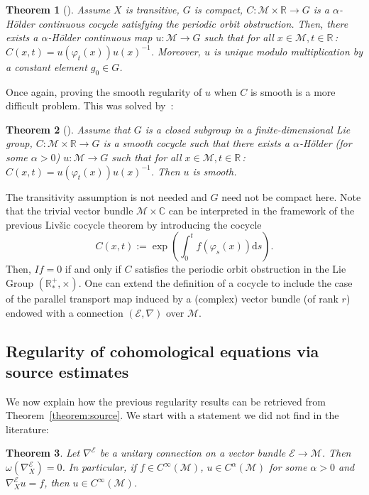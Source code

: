 \documentclass[10pt]{amsart}
\newtheorem{theo}{Theorem}[section]
\theoremstyle{definition}\newtheorem{defi}[theo]{Definition}\newtheorem{rema}[theo]{Remark}\newtheorem{exam}[theo]{Example}\newtheorem{exem}[theo]{Example}\newtheorem{nota}[theo]{Notation}
\newcommand{\C}{\mathbb{C}}
\newcommand{\R}{\mathbb{R}}
\newcommand{\mc}{\mathcal}
\newcommand{\M}{\mathcal{M}}
\newcommand{\E}{\mathcal{E}}
\newcommand{\dd}{\mathrm{d}}
\begin{document}
\begin{theo}[\cite{Livsic-72}]
Assume $X$ is transitive, $G$ is compact, $C : \mc{M} \times \R \rightarrow G$ is a $\alpha$-H\"older continuous cocycle satisfying the periodic orbit obstruction. Then, there exists a $\alpha$-H\"older continuous map $u : \M \rightarrow G$ such that for all $x \in \M, t \in \R\,$: $C(x,t) = u(\varphi_t(x))u(x)^{-1}$. Moreover, $u$ is unique modulo multiplication by a constant element $g_0 \in G$.
\end{theo}

Once again, proving the smooth regularity of $u$ when $C$ is smooth is a more difficult problem. This was solved by~\cite[Theorem~2.4]{Nitica-Torok-98}:

\begin{theo}[\cite{Nitica-Torok-98}]\label{theorem:livsic-smooth-cocycle}
Assume that $G$ is a closed subgroup in a finite-dimensional Lie group, $C : \mc{M} \times \R \rightarrow G$ is a smooth cocycle such that there exists a $\alpha$-H\"older (for some $\alpha > 0$) $u : \M \rightarrow G$ such that for all $x \in \M, t \in \R\,$: $C(x,t) = u(\varphi_t(x))u(x)^{-1}$. Then $u$ is smooth.
\end{theo}

The transitivity assumption is not needed and $G$ need not be compact here. Note that the trivial vector bundle $\M \times \C$ can be interpreted in the framework of the previous Liv{\v s}ic cocycle theorem by introducing the cocycle
\[
C(x,t) := \exp\left(\int_0^t f(\varphi_s(x)) \dd s \right).
\]
Then, $If = 0$ if and only if $C$ satisfies the periodic orbit obstruction in the Lie Group $(\R^+_*,\times)$. One can extend the definition of a cocycle to include the case of the parallel transport map induced by a (complex) vector bundle (of rank $r$) endowed with a connection $(\mc{E},\nabla)$ over $\M$.



\subsection{Regularity of cohomological equations via source estimates}


We now explain how the previous regularity results can be retrieved from Theorem~\ref{theorem:source}. We start with a statement we did not find in the literature:

\begin{theo}\label{theorem:smoothness}
Let $\nabla^{\E}$ be a unitary connection on a vector bundle $\E \rightarrow \M$. Then $\omega(\nabla^{\E}_X)=0$. In particular, if $f \in C^\infty(\M)$, $u \in C^\alpha(\M)$ for some $\alpha > 0$ and $\nabla^{\E}_X u = f$, then $u \in C^\infty(\M)$.
\end{theo}
\end{document}
